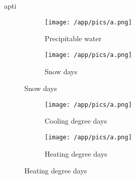 apti     \documentclass[10pt,a4paper,UTF8]{article}
\begin{document}
{\begin{figure}[H]
\begin{minipage}[t]{0.48\textwidth}
    \end{minipage}
    \hfill
\end{figure}%
\begin{figure}[H]  %
    \begin{minipage}[t]{0.48\textwidth}
    \centering
    \begin{figure}[H]
    \vspace*{-5mm}
    \caption{ Precipitable water }
    \texttt{[image: /app/pics/a.png]}
    \end{figure}
    \end{minipage}
    \hfill
\centering
    \begin{minipage}[t]{0.48\textwidth}
    \centering
    \begin{figure}[H]
    \vspace*{-5mm}
    \caption{ Snow days }
    \texttt{[image: /app/pics/a.png]}
    \end{figure}
    \end{minipage}
    \hfill
\end{figure}%
\begin{figure}[H]  %
    \begin{minipage}[t]{0.48\textwidth}
    \centering
    \begin{figure}[H]
    \vspace*{-5mm}
    \caption{ Cooling degree days }
    \texttt{[image: /app/pics/a.png]}
    \end{figure}
    \end{minipage}
    \hfill
\centering
    \begin{minipage}[t]{0.48\textwidth}
    \centering
    \begin{figure}[H]
    \vspace*{-5mm}
    \caption{ Heating degree days }
    \texttt{[image: /app/pics/a.png]}
    \end{figure}
    \end{minipage}
    \hfill
\end{figure}\newpage{}
}
\end{document}
